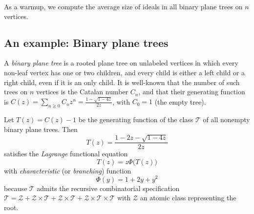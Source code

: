\documentclass[11pt, onesided]{amsart}
\theoremstyle{remark}
\begin{document}
As a warmup,  we compute the average size of ideals in all binary plane trees on $n$ vertices. 

\subsection{An example: Binary plane trees}
\label{sec:ExampleRed}

A {\em binary plane tree} is a rooted plane tree on unlabeled vertices in which every non-leaf vertex has one or two children, and every child is either a
left child or a right child, even if it is an only child. It is well-known that the number of such trees on $n$ vertices is the Catalan number $C_n$, and that
their generating function is $C(z)=\sum_{n\geq 0} C_nz^n=\frac{1-\sqrt{1-4z}}{2z}$, with $C_0=1$ (the empty tree).

Let $T(z)=C(z)-1$ be the generating function of the class $\mathcal T$ of all nonempty binary plane trees.  Then
 \begin{equation}
 \label{fort}
 	T(z)=\frac{1-2z-\sqrt{1-4z}}{2z}
\end{equation}
satisfies the \emph{Lagrange} functional equation
$$
	T(z)=z\Phi\big(T(z)\big)
$$
with \emph{characteristic} (or \emph{branching}) function
\begin{equation}
\label{eq:branchEqBinary}
	\Phi(y) = 1+2y+y^2
\end{equation}
because $\mathcal T$ admits the recursive combinatorial specification
$\mathcal T = \mathcal Z +\mathcal Z \times \mathcal T +\mathcal Z \times \mathcal T + \mathcal Z \times \mathcal T \times \mathcal T$
with $\mathcal Z$ an atomic class representing the root.
\end{document}

